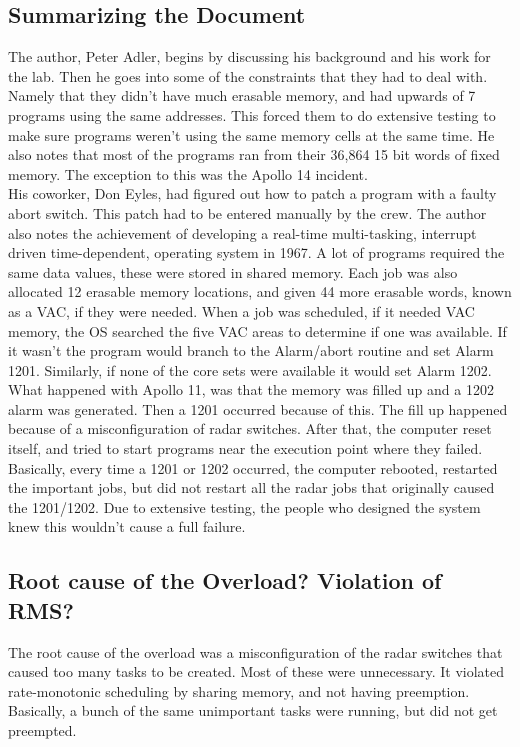 \documentclass{article}
\begin{document}
\subsection*{Summarizing the Document}
The author, Peter Adler, begins by discussing his background and his work for the lab. Then he goes into some of the constraints that they had to deal with. Namely that they didn't have much erasable memory, and had upwards of 7 programs using the same addresses. This forced them to do extensive testing to make sure programs weren't using the same memory cells at the same time. He also notes that most of the programs ran from their 36,864 15 bit words of fixed memory. The exception to this
was the Apollo 14 incident.\\
His coworker, Don Eyles, had figured out how to patch a program with a faulty abort switch. This patch had to be entered manually by the crew. The author also notes the achievement of developing a real-time multi-tasking, interrupt driven time-dependent, operating system in 1967. A lot of programs required the same data values, these were stored in shared memory. Each job was also allocated 12 erasable memory locations, and given 44 more erasable words, known as a VAC, if they were needed. When a job was
scheduled, if it needed VAC memory, the OS searched the five VAC areas to determine if one was available. If it wasn't the program would branch to the Alarm/abort routine and set Alarm 1201. Similarly, if none of the core sets were available it would set Alarm 1202.\\
What happened with Apollo 11, was that the memory was filled up and a 1202 alarm was generated. Then a 1201 occurred because of this. The fill up happened because of a misconfiguration of radar switches. After that, the computer reset itself, and tried to start programs near the execution point where they failed. Basically, every time a 1201 or 1202 occurred, the computer rebooted, restarted the important jobs, but did not restart all the radar jobs that originally caused the 1201/1202. Due to extensive testing, the people who designed the system knew
this wouldn't cause a full failure.

\subsection*{Root cause of the Overload? Violation of RMS?}
The root cause of the overload was a misconfiguration of the radar switches that caused too many tasks to be created. Most of these were unnecessary. It violated rate-monotonic scheduling by sharing memory, and not having preemption. Basically, a bunch of the same unimportant tasks were running, but did not get preempted.
\end{document}

